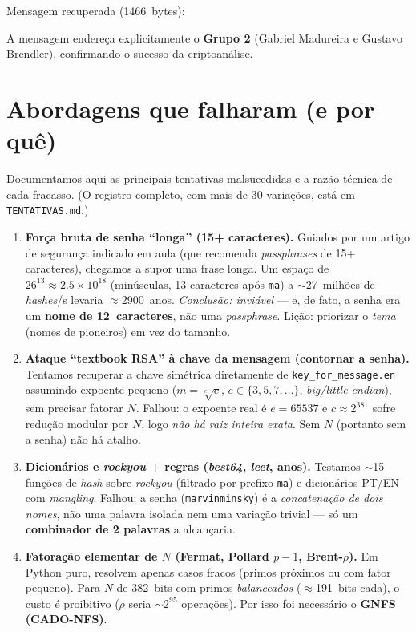 \documentclass[11pt,a4paper]{article}
\begin{document}
\noindent Mensagem recuperada (1466~bytes):


\noindent A mensagem endereça explicitamente o \textbf{Grupo 2} (Gabriel Madureira e Gustavo
Brendler), confirmando o sucesso da criptoanálise.

\section{Abordagens que falharam (e por quê)}
\label{sec:falhas}
Documentamos aqui as principais tentativas malsucedidas e a razão técnica de cada fracasso. (O
registro completo, com mais de 30 variações, está em \texttt{TENTATIVAS.md}.)

\begin{enumerate}[leftmargin=*]
  \item \textbf{Força bruta de senha ``longa'' (15+ caracteres).}
  Guiados por um artigo de segurança indicado em aula (que recomenda \emph{passphrases} de 15+
  caracteres), chegamos a supor uma frase longa. Um espaço de $26^{13}\approx 2.5\times10^{18}$
  (minúsculas, 13 caracteres após \texttt{ma}) a $\sim$27~milhões de \emph{hashes}/s levaria
  $\approx$2900~anos. \emph{Conclusão: inviável} --- e, de fato, a senha era um \textbf{nome de
  12~caracteres}, não uma \emph{passphrase}. Lição: priorizar o \emph{tema} (nomes de pioneiros)
  em vez do tamanho.

  \item \textbf{Ataque ``textbook RSA'' à chave da mensagem (contornar a senha).}
  Tentamos recuperar a chave simétrica diretamente de \texttt{key\_for\_message.en} assumindo
  expoente pequeno ($m=\sqrt[e]{c}$, $e\in\{3,5,7,\dots\}$, \emph{big/little-endian}), sem precisar
  fatorar $N$. Falhou: o expoente real é $e=65537$ e $c\approx 2^{381}$ sofre redução modular por
  $N$, logo \emph{não há raiz inteira exata}. Sem $N$ (portanto sem a senha) não há atalho.

  \item \textbf{Dicionários e \emph{rockyou} + regras (\emph{best64}, \emph{leet}, anos).}
  Testamos $\sim$15 funções de \emph{hash} sobre \emph{rockyou} (filtrado por prefixo \texttt{ma})
  e dicionários PT/EN com \emph{mangling}. Falhou: a senha (\texttt{marvinminsky}) é a
  \emph{concatenação de dois nomes}, não uma palavra isolada nem uma variação trivial --- só um
  \textbf{combinador de 2 palavras} a alcançaria.

  \item \textbf{Fatoração elementar de $N$ (Fermat, Pollard $p\!-\!1$, Brent-$\rho$).}
  Em Python puro, resolvem apenas casos fracos (primos próximos ou com fator pequeno). Para
  $N$ de 382~bits com primos \emph{balanceados} ($\approx$191~bits cada), o custo é proibitivo
  ($\rho$ seria $\sim$$2^{95}$ operações). Por isso foi necessário o \textbf{GNFS (CADO-NFS)}.
\end{enumerate}
\end{document}
